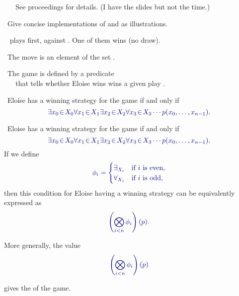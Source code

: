 \documentclass%
[%
Screen4to3,
]{foils}
\begin{document}
~~~\,See proceedings for details. (I have the slides but not the time.)

\vfill

~Give concise implementations of  and
 as illustrations.

\vfill



\vfill

~ plays first, against
. One of them wins (no draw).

\vfill

~The  move is an
element of the set .

\vfill

~The game is defined by
a predicate 
\\ ~~~\,that tells whether Eloise wins
wins a given play . 

\vfill

~Eloise has a winning strategy for the
game  if and only if
\[
\darkblue{\exists x_0 \!\in\! X_0 \forall x_1 \!\in\! X_1\exists x_{2} \!\in\! X_{2} \forall x_{3} \!\in\! X_{3} \cdots p(x_0, \ldots, x_{n-1})}.
\]


~Eloise has a winning strategy for the game  if
and only if
\[
\darkblue{\exists x_0 \!\in\! X_0 \forall x_1 \!\in\! X_1\exists x_{2} \!\in\! X_{2} \forall x_{3} \!\in\! X_{3} \cdots p(x_0, \ldots, x_{n-1})}.
\]
If we define
\[
  \darkblue{\phi_i =  
  \begin{cases}
    \exists_{X_i} & \text{if $i$ is even,} \\
    \forall_{X_i} & \text{if $i$ is odd,} 
  \end{cases}}
\]
then this condition for Eloise
having a winning strategy can be equivalently expressed as
%
\[ \darkblue{\left(\bigotimes_{i<n} \phi_i\right)(p)}. \] 


More generally,
the value
\[ \darkblue{\left(\bigotimes_{i<n} \phi_i\right)(p)} \]

gives the  of the game.
\end{document}
